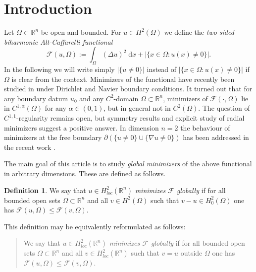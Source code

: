 \documentclass[twoside,11pt]{article}
\theoremstyle{definition}
\newtheorem{definition}{Definition}
\begin{document}


\section{Introduction}

Let $\Omega \subset \mathbb{R}^n$ be open and bounded. For $u \in H^2(\Omega)$ we define the \emph{two-sided biharmonic Alt-Caffarelli functional}
\begin{equation}\label{eq:bihAC}
    \mathcal{F}(u,\Omega) := \int_\Omega (\Delta u)^2 \; \mathrm{d}x + |\{x \in \Omega : u(x) \neq 0 \}|.
\end{equation}
In the following we will write simply $|\{u \neq 0 \}|$ instead of $|\{ x \in \Omega : u(x) \neq 0 \}|$ if $\Omega$ is clear from the context. Minimizers of the functional have recently been studied in \cite{GMMathAnn} under Dirichlet and Navier boundary conditions. It turned out that for any 
boundary datum $u_0$ and any $C^2$-domain $\Omega \subset\mathbb{R}^n$, minimizers of $\mathcal{F}(\cdot,\Omega)$ lie in $C^{1,\alpha}(\Omega)$ for any $\alpha \in (0,1)$, but in general not in $C^2(\Omega)$.
The question of $C^{1,1}$-regularity remains open, but symmetry results and explicit study of radial minimizers suggest a positive answer. In dimension $n = 2$ the behaviour  of minimizers at the free boundary $\partial (\{u\not=0\}\cup\{\nabla u\not=0\})$ has been addressed in the recent work \cite{Nahon}.




The main goal of this article is to study \emph{global minimizers} of the above functional in arbitrary dimensions. These are defined as follows.
\begin{definition}\label{eq:globalmibn}
    We say that $u \in H^2_{loc}(\mathbb{R}^n)$ \emph{minimizes $\mathcal{F}$ globally%
    } 
    if for all bounded open sets $\Omega \subset \mathbb{R}^n$ and all $v \in H^2(\Omega)$ such that $v- u \in H_0^2(\Omega)$ one has $\mathcal{F}(u,\Omega) \leq \mathcal{F}(v,\Omega)$. 
\end{definition}

\noindent
This definition may be equivalently reformulated as follows: 
\begin{quote}
    We say that $u \in H^2_{loc}(\mathbb{R}^n)$ \emph{minimizes $\mathcal{F}$ globally} 
if for all bounded open sets $\Omega \subset \mathbb{R}^n$ and all $v \in  H^2_{loc}(\mathbb{R}^n)$ such that $v= u $ outside $\Omega$ one has $\mathcal{F}(u,\Omega) \leq \mathcal{F}(v,\Omega)$. 		
\end{quote}
\end{document}
